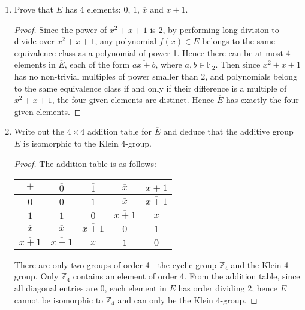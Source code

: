 \documentclass{article}
\begin{document}
  \begin{enumerate}[label={\bf(\alph*)}]
    \item Prove that $\overline{E}$ has 4 elements: $\overline{0}$,
      $\overline{1}$, $\overline{x}$ and $\overline{x+1}$.
      \begin{proof}
        Since the power of $x^2+x+1$ is 2, by performing long division to
        divide over $x^2+x+1$, any polynomial $f(x)\in E$
        belongs to the same equivalence class as a polynomial of power 1.
        Hence there can be at most 4 elements in $\overline{E}$, each of
        the form $\overline{ax+b}$, where $a,b\in\mathbb{F}_2$. Then since
        $x^2+x+1$ has no non-trivial multiples of power smaller than 2, and
        polynomials belong to the same equivalence class if and only if
        their difference is a multiple of $x^2+x+1$, the four given elements
        are distinct. Hence $\overline{E}$ has exactly the four given
        elements.
      \end{proof}

    \item Write out the $4\times4$ addition table for $\overline{E}$ and
      deduce that the additive group $\overline{E}$ is isomorphic to the
      Klein 4-group.
      \begin{proof}
        The addition table is as follows:
        \begin{center}
          \begin{tabular}{c|cccc}
            $+$ & $\overline{0}$ & $\overline{1}$ & $\overline{x}$ &
              $\overline{x+1}$ \\
            \hline
            $\overline{0}$ & $\overline{0}$ & $\overline{1}$ & $\overline{x}$ &
              $\overline{x+1}$ \\
            $\overline{1}$ & $\overline{1}$ & $\overline{0}$ &
              $\overline{x+1}$ & $\overline{x}$ \\
            $\overline{x}$ & $\overline{x}$ & $\overline{x+1}$ &
              $\overline{0}$ & $\overline{1}$ \\
            $\overline{x+1}$ & $\overline{x+1}$ & $\overline{x}$ &
              $\overline{1}$ & $\overline{0}$ \\
          \end{tabular}
        \end{center}
        There are only two groups of order 4 - the cyclic group
        $\mathbb{Z}_4$ and the Klein 4-group. Only $\mathbb{Z}_4$ contains
        an element of order 4. From the addition table, since all diagonal
        entries are 0, each element in $\overline{E}$ has order dividing 2,
        hence $\overline{E}$ cannot be isomorphic to $\mathbb{Z}_4$ and can
        only be the Klein 4-group.
      \end{proof}


\end{enumerate}
\end{document}
